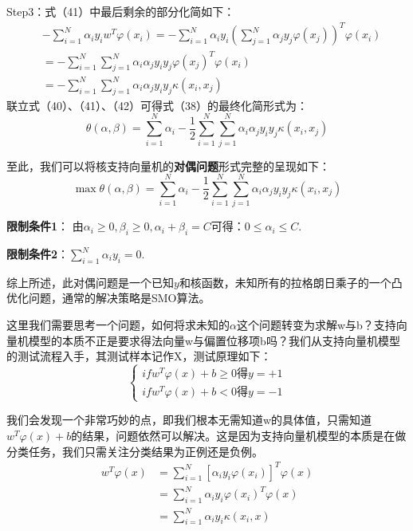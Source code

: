 Step3：式（41）中最后剩余的部分化简如下：
\begin{equation}\begin{aligned}
		&-\sum_{i=1}^N\alpha_iy_iw^T\varphi(x_i)=-\sum_{i=1}^N\alpha_iy_i(\sum_{j=1}^N\alpha_jy_j\varphi(x_j))^T\varphi(x_i) \\
		&=-\sum_{i=1}^N\sum_{j=1}^N\alpha_i\alpha_jy_iy_j\varphi(x_j)^T\varphi(x_i) \\
		&=-\sum_{i=1}^N\sum_{j=1}^N\alpha_i\alpha_jy_iy_j\kappa(x_i,x_j)
\end{aligned}\end{equation}
联立式（40）、（41）、（42）可得式（38）的最终化简形式为：
\begin{equation}\theta(\alpha,\beta)=\sum_{i=1}^N\alpha_i-\frac12\sum_{i=1}^N\sum_{j=1}^N\alpha_i\alpha_jy_iy_j\kappa(x_i,x_j)\end{equation}

至此，我们可以将核支持向量机的\textbf{对偶问题}形式完整的呈现如下：
\begin{equation}\max\theta(\alpha,\beta)=\sum_{i=1}^N\alpha_i-\frac12\sum_{i=1}^N\sum_{j=1}^N\alpha_i\alpha_jy_iy_j\kappa(x_i,x_j)\end{equation}

\textbf{限制条件1}：
由$\alpha_i\geq0,\beta_i\geq0,\alpha_i+\beta_i=C$可得：$0\leq\alpha_i\leq C$.

\textbf{限制条件2}：$\sum_{i=1}^N\alpha_iy_i=0$.

综上所述，此对偶问题是一个已知$y$和核函数，未知所有的拉格朗日乘子的一个凸优化问题，通常的解决策略是SMO算法。

这里我们需要思考一个问题，如何将求未知的$\alpha$这个问题转变为求解w与b？支持向量机模型的本质不正是要求得法向量w与偏置位移项b吗？我们从支持向量机模型的测试流程入手，其测试样本记作X，测试原理如下：
\begin{equation}\begin{cases}if w^T\varphi(x)+b\geq0 得 y=+1\\if w^T\varphi(x)+b<0得y=-1\end{cases}\end{equation}

我们会发现一个非常巧妙的点，即我们根本无需知道w的具体值，只需知道$w^T\varphi(x)+b$的结果，问题依然可以解决。这是因为支持向量机模型的本质是在做分类任务，我们只需关注分类结果为正例还是负例。
\begin{equation}
	\begin{aligned}
		w^T\varphi(x) &= \sum_{i=1}^N[\alpha_iy_i\varphi(x_i)]^T\varphi(x) \\
		&= \sum_{i=1}^N\alpha_iy_i\varphi(x_i)^T\varphi(x) \\
		&= \sum_{i=1}^N\alpha_iy_i\kappa(x_i,x)
	\end{aligned}
\end{equation}

